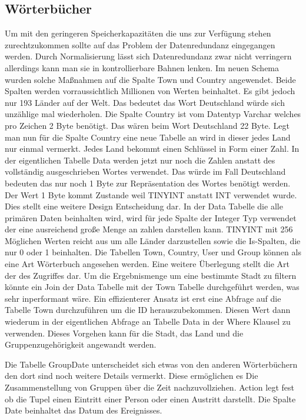 \subsection{Wörterbücher}

Um mit den geringeren Speicherkapazitäten die uns zur Verfügung stehen zurechtzukommen sollte auf das Problem der Datenredundanz eingegangen werden. Durch Normalisierung lässt sich Datenredundanz zwar nicht verringern allerdings kann man sie in kontrollierbare Bahnen lenken. Im neuen Schema wurden solche Maßnahmen auf die Spalte Town und Country angewendet. Beide Spalten werden vorraussichtlich Millionen von Werten beinhaltet. Es gibt jedoch nur 193 Länder auf der Welt. Das bedeutet das Wort Deutschland würde sich unzählige mal wiederholen. Die Spalte Country ist vom Datentyp Varchar welches pro Zeichen 2 Byte benötigt. Das wären beim Wort Deutschland 22 Byte. Legt man nun für die Spalte Country eine neue Tabelle an wird in dieser jedes Land nur einmal vermerkt. Jedes Land bekommt einen Schlüssel in Form einer Zahl. In der eigentlichen Tabelle Data werden jetzt nur noch die Zahlen anstatt des vollständig ausgeschrieben Wortes verwendet. Das würde im Fall Deutschland bedeuten das nur noch 1 Byte zur Repräsentation des Wortes benötigt werden. Der Wert 1 Byte kommt Zustande weil TINYINT anstatt INT verwendet wurde. Dies stellt eine weitere Design Entscheidung dar. In der Data Tabelle die alle primären Daten beinhalten wird, wird für jede Spalte der Integer Typ verwendet der eine ausreichend große Menge an zahlen darstellen kann. TINYINT mit 256 Möglichen Werten reicht aus um alle Länder darzustellen sowie die Is-Spalten, die nur 0 oder 1 beinhalten. Die Tabellen Town, Country, User und Group können als eine Art Wörterbuch angesehen werden. Eine weitere Überlegung stellt die Art der des Zugriffes dar. Um die Ergebnismenge um eine bestimmte Stadt zu filtern könnte ein Join der Data Tabelle mit der Town Tabelle durchgeführt werden, was sehr inperformant wäre. Ein effizienterer Ansatz ist erst eine Abfrage auf die Tabelle Town durchzuführen um die ID herauszubekommen. Diesen Wert dann wiederum in der eigentlichen Abfrage an Tabelle Data in der Where Klausel zu verwenden. Dieses Vorgehen kann für die Stadt, das Land und die Gruppenzugehörigkeit angewandt werden.

Die Tabelle GroupDate unterscheidet sich etwas von den anderen Wörterbüchern den dort sind noch weitere Details vermerkt. Diese ermöglichen es Die Zusammenstellung von Gruppen über die Zeit nachzuvollziehen. Action legt fest ob die Tupel einen Eintritt einer Person oder einen Austritt darstellt. Die Spalte Date beinhaltet das Datum des Ereignisses. 

